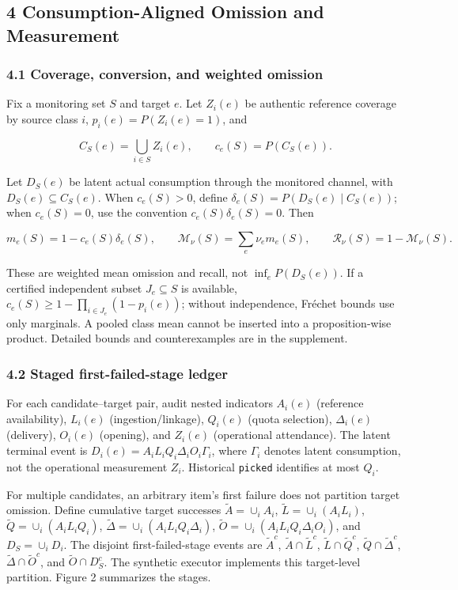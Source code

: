 \documentclass[
  11pt]{article}
\begin{document}
\subsection{4 Consumption-Aligned Omission and
Measurement}\label{consumption-aligned-omission-and-measurement}

\subsubsection{4.1 Coverage, conversion, and weighted
omission}\label{coverage-conversion-and-weighted-omission}

Fix a monitoring set \(S\) and target \(e\). Let \(Z_i(e)\) be authentic
reference coverage by source class \(i\), \(p_i(e)=P(Z_i(e)=1)\), and

\[C_S(e)=\bigcup_{i\in S}Z_i(e),\qquad c_e(S)=P(C_S(e)).\]

Let \(D_S(e)\) be latent actual consumption through the monitored
channel, with \(D_S(e)\subseteq C_S(e)\). When \(c_e(S)>0\), define
\(\delta_e(S)=P(D_S(e)\mid C_S(e))\); when \(c_e(S)=0\), use the
convention \(c_e(S)\delta_e(S)=0\). Then

\[m_e(S)=1-c_e(S)\delta_e(S),\qquad \mathcal M_\nu(S)=\sum_e\nu_e m_e(S),\qquad \mathcal R_\nu(S)=1-\mathcal M_\nu(S).\tag{4}\]

These are weighted mean omission and recall, not \(\inf_e P(D_S(e))\).
If a certified independent subset \(J_e\subseteq S\) is available,
\(c_e(S)\ge1-\prod_{i\in J_e}(1-p_i(e))\); without independence, Fréchet
bounds use only marginals. A pooled class mean cannot be inserted into a
proposition-wise product. Detailed bounds and counterexamples are in the
supplement.

\subsubsection{4.2 Staged first-failed-stage
ledger}\label{staged-first-failed-stage-ledger}

For each candidate--target pair, audit nested indicators \(A_i(e)\)
(reference availability), \(L_i(e)\) (ingestion/linkage), \(Q_i(e)\)
(quota selection), \(\Delta_i(e)\) (delivery), \(O_i(e)\) (opening), and
\(Z_i(e)\) (operational attendance). The latent terminal event is
\(D_i(e)=A_iL_iQ_i\Delta_iO_i\Gamma_i\), where \(\Gamma_i\) denotes
latent consumption, not the operational measurement \(Z_i\). Historical
\texttt{picked} identifies at most \(Q_i\).

For multiple candidates, an arbitrary item's first failure does not
partition target omission. Define cumulative target successes
\(\widetilde A=\cup_iA_i\), \(\widetilde L=\cup_i(A_iL_i)\),
\(\widetilde Q=\cup_i(A_iL_iQ_i)\),
\(\widetilde\Delta=\cup_i(A_iL_iQ_i\Delta_i)\),
\(\widetilde O=\cup_i(A_iL_iQ_i\Delta_iO_i)\), and \(D_S=\cup_iD_i\).
The disjoint first-failed-stage events are \(\widetilde A^c\),
\(\widetilde A\cap\widetilde L^c\), \(\widetilde L\cap\widetilde Q^c\),
\(\widetilde Q\cap\widetilde\Delta^c\),
\(\widetilde\Delta\cap\widetilde O^c\), and \(\widetilde O\cap D_S^c\).
The synthetic executor implements this target-level partition. Figure 2
summarizes the stages.
\end{document}
